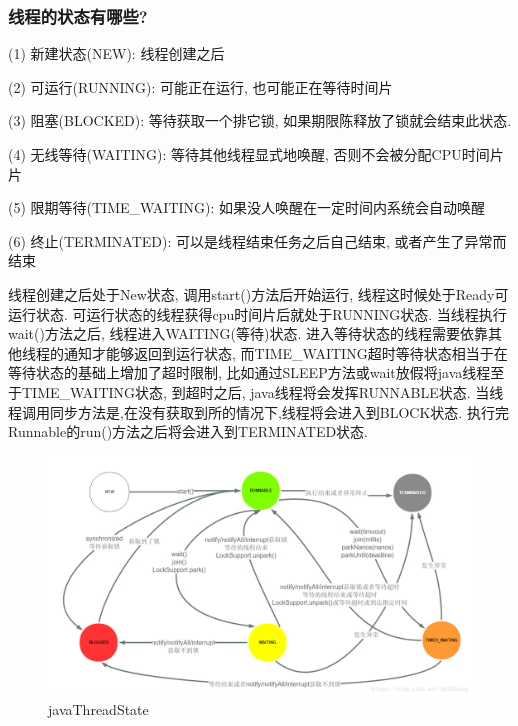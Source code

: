\documentclass[UTF8]{ctexart}
\begin{document}
\subsubsection{线程的状态有哪些?}
(1) 新建状态(NEW): 线程创建之后 \par
(2) 可运行(RUNNING): 可能正在运行, 也可能正在等待时间片 \par
(3) 阻塞(BLOCKED): 等待获取一个排它锁, 如果期限陈释放了锁就会结束此状态. \par
(4) 无线等待(WAITING): 等待其他线程显式地唤醒, 否则不会被分配CPU时间片片 \par
(5) 限期等待(TIME\_WAITING): 如果没人唤醒在一定时间内系统会自动唤醒 \par
(6) 终止(TERMINATED): 可以是线程结束任务之后自己结束, 或者产生了异常而结束 \par
线程创建之后处于New状态, 调用start()方法后开始运行, 线程这时候处于Ready可运行状态. 可运行状态的线程获得cpu时间片后就处于RUNNING状态. 当线程执行wait()方法之后, 线程进入WAITING(等待)状态. 进入等待状态的线程需要依靠其他线程的通知才能够返回到运行状态, 而TIME\_WAITING超时等待状态相当于在等待状态的基础上增加了超时限制, 比如通过SLEEP方法或wait放假将java线程至于TIME\_WAITING状态, 到超时之后, java线程将会发挥RUNNABLE状态. 当线程调用同步方法是,在没有获取到所的情况下,线程将会进入到BLOCK状态. 执行完Runnable的run()方法之后将会进入到TERMINATED状态.
\begin{figure}
	\centering
	\includegraphics[width=0.7\linewidth]{figures/javaThreadState.png}
	\caption{javaThreadState}
	\label{fig:javaThreadState}
\end{figure}
\end{document}

